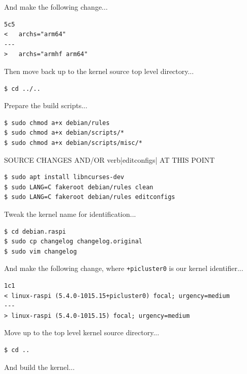 \documentclass{report}
\begin{document}
And make the following change...

\lstset{style=listingstyle}
\begin{lstlisting}[caption=diff kernelconfig kernelconfig.original, numbers=none]
5c5
< 	archs="arm64"
---
> 	archs="armhf arm64"
\end{lstlisting}

Then move back up to the kernel source top level directory...

\lstset{style=termstyle}
\begin{lstlisting}
$ cd ../..
\end{lstlisting}

Prepare the build scripts...

\lstset{style=termstyle}
\begin{lstlisting}
$ sudo chmod a+x debian/rules
$ sudo chmod a+x debian/scripts/*
$ sudo chmod a+x debian/scripts/misc/*
\end{lstlisting}

SOURCE CHANGES AND/OR verb|editconfigs| AT THIS POINT

\lstset{style=termstyle}
\begin{lstlisting}
$ sudo apt install libncurses-dev
$ sudo LANG=C fakeroot debian/rules clean
$ sudo LANG=C fakeroot debian/rules editconfigs
\end{lstlisting}

Tweak the kernel name for identification...

\lstset{style=termstyle}
\begin{lstlisting}
$ cd debian.raspi
$ sudo cp changelog changelog.original
$ sudo vim changelog
\end{lstlisting}

And make the following change, where \verb|+picluster0| is our kernel identifier...

\lstset{style=listingstyle}
\begin{lstlisting}[caption=diff changelog changelog.original, numbers=none]
1c1
< linux-raspi (5.4.0-1015.15+picluster0) focal; urgency=medium
---
> linux-raspi (5.4.0-1015.15) focal; urgency=medium
\end{lstlisting}

Move up to the top level kernel source directory...

\lstset{style=termstyle}
\begin{lstlisting}
$ cd ..
\end{lstlisting}

And build the kernel...
\end{document}
